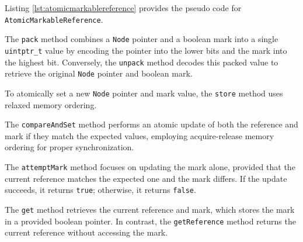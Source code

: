 Listing \ref{lst:atomicmarkablereference} provides the pseudo code for \texttt{AtomicMarkableReference}.

The \texttt{pack} method combines a \texttt{Node} pointer and a boolean mark into a single \texttt{uintptr\_t} value by encoding the pointer into the lower bits and the mark into the highest bit. Conversely, the \texttt{unpack} method decodes this packed value to retrieve the original \texttt{Node} pointer and boolean mark.

To atomically set a new \texttt{Node} pointer and mark value, the \texttt{store} method uses relaxed memory ordering.

The \texttt{compareAndSet} method performs an atomic update of both the reference and mark if they match the expected values, employing acquire-release memory ordering for proper synchronization.

The \texttt{attemptMark} method focuses on updating the mark alone, provided that the current reference matches the expected one and the mark differs. If the update succeeds, it returns \texttt{true}; otherwise, it returns \texttt{false}.

The \texttt{get} method retrieves the current reference and mark, which stores the mark in a provided boolean pointer. In contrast, the \texttt{getReference} method returns the current reference without accessing the mark.

\begin{figure}[!p]
    \centering
    
\end{figure}